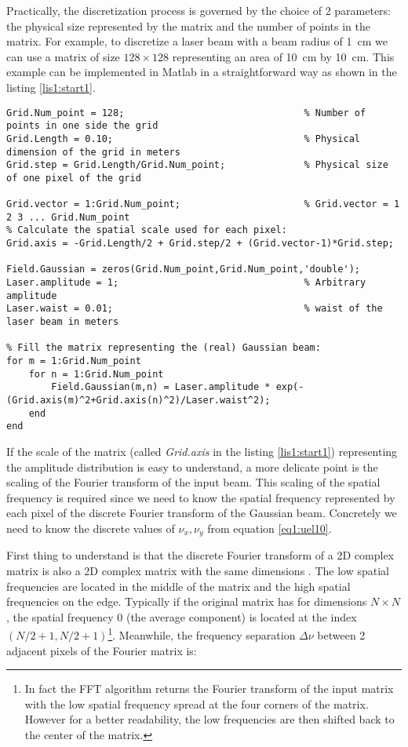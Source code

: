 Practically, the discretization process is governed by the choice of 2 parameters: the physical size represented by the matrix and the number of points in the matrix. For example, to discretize a laser beam with a beam radius of 1~cm we can use a matrix of size $128 \times 128$ representing an area of 10~cm by 10~cm. This example can be implemented in Matlab in a straightforward way as shown in the listing \ref{lis1:start1}.

\begin{lstlisting}[float=tp,caption=Discretization of a Gaussian beam\label{lis1:start1},frame=lines]
Grid.Num_point = 128;                                % Number of points in one side the grid
Grid.Length = 0.10;                                  % Physical dimension of the grid in meters
Grid.step = Grid.Length/Grid.Num_point;              % Physical size of one pixel of the grid

Grid.vector = 1:Grid.Num_point;                      % Grid.vector = 1 2 3 ... Grid.Num_point
% Calculate the spatial scale used for each pixel:
Grid.axis = -Grid.Length/2 + Grid.step/2 + (Grid.vector-1)*Grid.step;

Field.Gaussian = zeros(Grid.Num_point,Grid.Num_point,'double');
Laser.amplitude = 1;                                 % Arbitrary amplitude
Laser.waist = 0.01;                                  % waist of the laser beam in meters

% Fill the matrix representing the (real) Gaussian beam:
for m = 1:Grid.Num_point
    for n = 1:Grid.Num_point
        Field.Gaussian(m,n) = Laser.amplitude * exp(-(Grid.axis(m)^2+Grid.axis(n)^2)/Laser.waist^2);
    end
end

\end{lstlisting}

If the scale of the matrix (called \emph{Grid.axis} in the listing \ref{lis1:start1}) representing the amplitude distribution is easy to understand, a more delicate point is the scaling of the Fourier transform of the input beam. This scaling of the spatial frequency is required since we need to know the spatial frequency represented by each pixel of the discrete Fourier transform of the Gaussian beam. Concretely we need to know the discrete values of $\nu_x,\nu_y$ from equation \ref{eq1:uel10}.

First thing to understand is that the discrete Fourier transform of a 2D complex matrix is also a 2D complex matrix with the same dimensions \cite{Fourier2D}. The low spatial frequencies are located in the middle of the matrix and the high spatial frequencies on the edge. Typically if the original matrix has for dimensions $N \times N$, the spatial frequency 0 (the average component) is located at the index $(N/2+1,N/2+1)$\footnote{In fact the FFT algorithm returns the Fourier transform of the input matrix with the low spatial frequency spread at the four corners of the matrix. However for a better readability, the low frequencies are then shifted back to the center of the matrix.}. Meanwhile, the frequency separation $\Delta \nu$ between 2 adjacent pixels of the Fourier matrix is:

